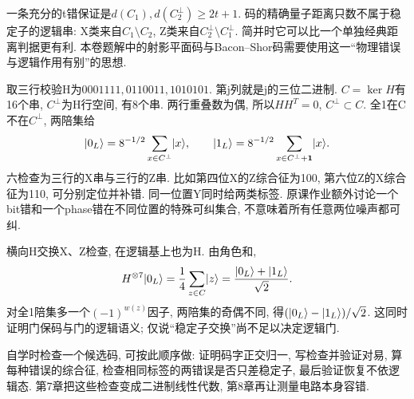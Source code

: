 一条充分的t错保证是$d(C_1),d(C_2^\perp)\ge2t+1$. 码的精确量子距离只数不属于稳定子的逻辑串: X类来自$C_1\setminus C_2$, Z类来自$C_2^\perp\setminus C_1^\perp$. 简并时它可以比一个单独经典距离判据更有利. 本卷题解中的射影平面码与Bacon--Shor码需要使用这一“物理错误与逻辑作用有别”的思想.

取三行校验H为$0001111,0110011,1010101$. 第j列就是j的三位二进制. $C=\ker H$有16个串, $C^\perp$为H行空间, 有8个串. 两行重叠数为偶, 所以$HH^T=0$, $C^\perp\subset C$. 全1在C不在$C^\perp$, 两陪集给
\[\lvert 0_L\rangle=8^{-1/2}\sum_{x\in C^\perp}\lvert x\rangle,\qquad
\lvert 1_L\rangle=8^{-1/2}\sum_{x\in C^\perp+\mathbf1}\lvert x\rangle.\]
六检查为三行的X串与三行的Z串. 比如第四位X的Z综合征为100, 第六位Z的X综合征为110, 可分别定位并补错. 同一位置Y同时给两类标签. 原课作业额外讨论一个bit错和一个phase错在不同位置的特殊可纠集合, 不意味着所有任意两位噪声都可纠.

横向H交换X、Z检查, 在逻辑基上也为H. 由角色和,
\[H^{\otimes7}\lvert 0_L\rangle=\frac14\sum_{z\in C}\lvert z\rangle
=\frac{\lvert 0_L\rangle+\lvert 1_L\rangle}{\sqrt2}.\]
对全1陪集多一个$(-1)^{w(z)}$因子, 两陪集的奇偶不同, 得$(\lvert 0_L\rangle-\lvert 1_L\rangle)/\sqrt2$. 这同时证明门保码与门的逻辑语义; 仅说“稳定子交换”尚不足以决定逻辑门.

自学时检查一个候选码, 可按此顺序做: 证明码字正交归一, 写检查并验证对易, 算每种错误的综合征, 检查相同标签的两错误是否只差稳定子, 最后验证恢复不依逻辑态. 第7章把这些检查变成二进制线性代数, 第8章再让测量电路本身容错.
